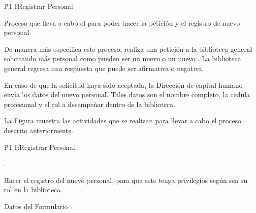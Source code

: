 




\begin{Proceso}{P1.1}{Registrar Personal} {
  
Proceso que lleva a cabo el  para poder hacer la petición y el registro de
nuevo personal.

De manera más especifica este proceso, realiza una petición a la biblioteca general solicitando más personal como pueden ser un nuevo  o un nuevo .
La biblioteca general regresa una respuesta que puede ser afirmativa o negativa.

En caso de que la solicitud haya sido aceptada, la Dirección de capital humano envía los datos del
nuevo personal. Tales datos son el nombre completo, la cedula profesional y el rol a desempeñar
dentro de la biblioteca.
  



  \noindent La Figura  muestra las actividades que se realizan para llevar a cabo el proceso descrito anteriormente.


} {P1.1:Registrar Personal}


   { %
    .
  }

   { %
    Hacer el registro del nuevo personal, para que este tenga privilegios según sea su rol en la biblioteca.
  }

   { %
  	\begin{UClist}
  		\UCli Datos del Formulario .
    \end {UClist}
  }
  

\end{Proceso}
